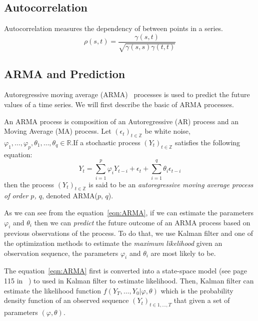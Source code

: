 \documentclass[12pt]{article}
\begin{document}
\subsection{Autocorrelation}
Autocorrelation measures the dependency of between points in a series. 
\begin{equation}
\rho(s,t)=\frac{\gamma(s,t)}{\sqrt{\gamma(s,s)\gamma(t,t)}}
\end{equation}

\subsection{ARMA and Prediction}
Autoregressive moving average (ARMA)~\cite{BoxTimeSeries, FalkStatSAS}
 processes is used to predict the future values of a time series. We will first
 describe the basic of ARMA processes.
 
 An ARMA process is composition of an Autoregressive (AR) process and an Moving
 Average (MA) process. Let $(\epsilon_t)_{t\in \mathbb{Z}}$ be white noise,
 $\varphi_1, \ldots, \varphi_p, \theta_1, \ldots, \theta_q\in\mathbb{R}$.If a
stochastic process $(Y_t)_{t\in \mathbb{Z}}$ satisfies the following
 equation:
 \begin{equation}\label{eqn:ARMA}
 Y_t=\sum_{i=1}^{p}\varphi_iY_{t-i}+
 \epsilon_t +\sum_{i=1}^{q}\theta_i\epsilon_{t-i}
 \end{equation}
then the process $(Y_t)_{t\in \mathbb{Z}}$ is said to be
an \textit{autoregressive moving average process of order $p$, $q$}, denoted
ARMA($p$, $q$).

As we can see from the equation~\ref{eqn:ARMA}, if we can estimate the
parameters $\varphi_i$ and $\theta_i$ then we can \textit{predict} the future
outcome of an ARMA process based on previous observations of the process. To do
that, we use Kalman filter and one of the optimization methods to estimate the
\textit{maximum likelihood} given an observation sequence, the parameters
$\varphi_i$ and $\theta_i$ are most likely to be.

The equation~\ref{eqn:ARMA} first is converted into a state-space model (see
page 115 in~\cite{FalkStatSAS} ) to used in Kalman filter to estimate
likelihood. Then, Kalman filter can estimate the likelihood function
$f(Y_T,\ldots, Y_0|\varphi, \theta)$ which is the probability density
function of an observed sequence $(Y_t)_{t\in 1, \ldots, T}$ that given a set of
parameters $(\varphi, \theta)$.
\end{document}
